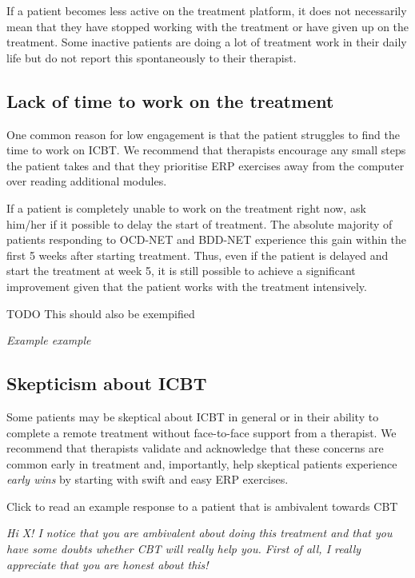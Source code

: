 \documentclass[]{book}
\theoremstyle{definition}
\theoremstyle{definition}
\theoremstyle{definition}
\theoremstyle{remark}
\begin{document}
If a patient becomes less active on the treatment platform, it does not
necessarily mean that they have stopped working with the treatment or
have given up on the treatment. Some inactive patients are doing a lot
of treatment work in their daily life but do not report this
spontaneously to their therapist.

\hypertarget{lack-of-time-to-work-on-the-treatment}{%
\subsection{Lack of time to work on the
treatment}\label{lack-of-time-to-work-on-the-treatment}}

One common reason for low engagement is that the patient struggles to
find the time to work on ICBT. We recommend that therapists encourage
any small steps the patient takes and that they prioritise ERP exercises
away from the computer over reading additional modules.

If a patient is completely unable to work on the treatment right now,
ask him/her if it possible to delay the start of treatment. The absolute
majority of patients responding to OCD-NET and BDD-NET experience this
gain within the first 5 weeks after starting treatment. Thus, even if
the patient is delayed and start the treatment at week 5, it is still
possible to achieve a significant improvement given that the patient
works with the treatment intensively.

 TODO This should also be exempified

\emph{Example example}

\hypertarget{skepticism-about-icbt}{%
\subsection{Skepticism about ICBT}\label{skepticism-about-icbt}}

Some patients may be skeptical about ICBT in general or in their ability
to complete a remote treatment without face-to-face support from a
therapist. We recommend that therapists validate and acknowledge that
these concerns are common early in treatment and, importantly, help
skeptical patients experience \emph{early wins} by starting with swift
and easy ERP exercises.

 Click to read an example response to a patient that is ambivalent
towards CBT

\emph{Hi X! I notice that you are ambivalent about doing this treatment
and that you have some doubts whether CBT will really help you. First of
all, I really appreciate that you are honest about this!}
\end{document}

